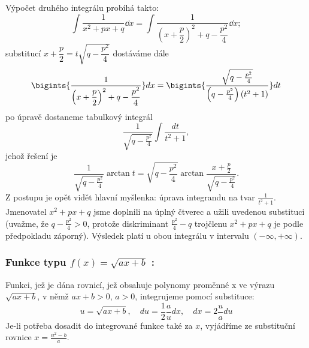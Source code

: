       Výpočet druhého integrálu probíhá takto: 
      \begin{equation}\label{MA:int_ex_10}
        \int\dfrac{1}{x^2+px+q}\dd{x} = 
          \int\dfrac{1}{\left(x+\dfrac{p}{2}\right)^2 + q - \dfrac{p^2}{4}}\dd{x};
      \end{equation}
      substitucí $x+\dfrac{p}{2} = t\sqrt{q - \dfrac{p^2}{4}}$ dostáváme dále
      \begin{equation*}\label{MA:int_ex_11}
        \bigints{\frac{1}{\displaystyle{\left(x+\frac{p}{2}\right)^2 + q - \frac{p^2}{4}}}}dx 
          =\displaystyle{
            \bigints{
              \frac{\sqrt{q-\frac{p^2}{4}}}{\left(q-\frac{p^2}{4}\right)(t^2+1)}}dt
            }   
      \end{equation*}
      po úpravě dostaneme tabulkový integrál
      \begin{equation}\label{MA:int_ex_12}
        \frac{1}{\sqrt{q-\frac{p^2}{4}}}\int{\frac{dt}{t^2+1}},
      \end{equation}
      jehož řešení je  
      \begin{equation*}\label{MA:int_ex_13}
        \frac{1}{\sqrt{q-\frac{p^2}{4}}}\arctan{t} 
          = \sqrt{q-\frac{p^2}{4}}\arctan\frac{x+\frac{p}{2}}{\sqrt{q-\frac{p^2}{4}}}.     
      \end{equation*}   
      Z postupu je opět vidět hlavní myšlenka: úprava integrandu na tvar $\frac{1}{t^2+1}$.
      Jmenovatel $x^2+px+q$ jsme doplnili na úplný čtverec a užili uvedenou substituci (uvažme,
      že $q-\frac{p^2}{4}>0$, protože diskriminant $\frac{p^2}{4}-q$ trojčlenu $x^2+px+q$ je
      podle předpokladu záporný). Výsledek platí u obou integrálu v intervalu \((-\infty,
      +\infty)\).
      
      \subsubsection*{Funkce typu $\boxed{f(x)=\sqrt{ax+b}}$ :}
         Funkci, jež je dána rovnicí, jež obsahuje polynomy proměnné x  ve výrazu $\sqrt{ax+b}$,
         v němž $ax+b>0$, $a>0$, integrujeme pomocí substituce:
         \begin{equation}\label{ma:eq_sub_fce1}
             u=\sqrt{ax+b},\quad du=\frac{1}{2}\frac{a}{u}dx,\quad dx=2\frac{u}{a}du
         \end{equation}
         Je-li potřeba dosadit do integrované funkce také za $x$, vyjádříme ze substituční
         rovnice $x=\frac{u^2-b}{a}$.
